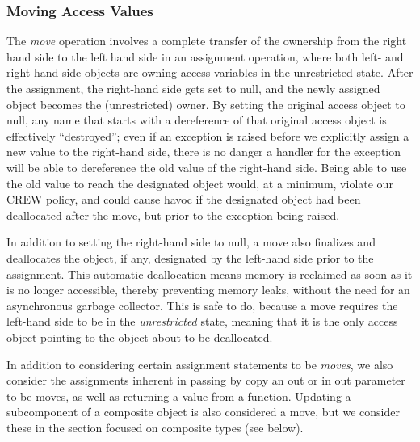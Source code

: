 \documentclass[runningheads]{llncs}
\newcommand{\keyword}[1]{\textsf{#1}}
\begin{document}
\subsubsection{Moving Access Values}
\label{sec:moving}

The \textit{move} operation involves a complete transfer of the ownership from the right hand side to the left hand side in an assignment operation, where both left- and right-hand-side objects are owning access variables in the unrestricted state.
After the assignment, the right-hand side gets set to null, and the newly assigned object becomes the (unrestricted) owner. By setting the original access object to null, any name that starts with a dereference of
that original access object is effectively ``destroyed'';  even if an exception is raised before we explicitly assign a new value to the right-hand side, there is no danger a handler for the exception will
be able to dereference the old value of the right-hand side.  Being able to use the old value to reach the designated object would, at a minimum, violate our CREW policy, and could cause havoc if the designated object had been deallocated after the move, but prior to the exception being raised.


In addition to setting the right-hand side to null, a move also finalizes and deallocates the object, if any, designated by the
left-hand side prior to the assignment.  This automatic deallocation means memory is reclaimed as soon as it is
no longer accessible, thereby preventing memory leaks, without the need for an asynchronous garbage collector.
This is safe to do, because a move requires the left-hand side to be in the \textit{unrestricted} state, meaning that
it is the only access object pointing to the object about to be deallocated.


In addition to considering certain assignment statements to be \textit{moves}, we also consider the assignments 
inherent in passing by copy an \keyword{out} or \keyword{in out} parameter to be moves, as well
as returning a value from a function.
Updating a subcomponent of a composite object is also considered a move, but
we consider these in the section focused on composite types (see below).
\end{document}
